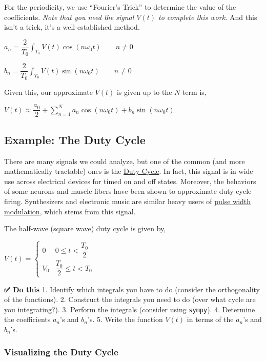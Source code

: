 For the periodicity, we use ``Fourier's Trick'' to determine the value
of the coefficients. \emph{Note that you need the signal \(V(t)\) to
complete this work.} And this isn't a trick, it's a well-established
method.

\(a_n = \dfrac{2}{T_0}\int_{T_0}V(t)\cos(n\omega_0t)\qquad n\neq0\)

\(b_n = \dfrac{2}{T_0}\int_{T_0}V(t)\sin(n\omega_0t)\qquad n\neq0\)

Given this, our approximate \(V(t)\) is given up to the \(N\) term is,

\(V(t) \approx \dfrac{a_0}{2} + \sum_{n=1}^{N} a_n \cos(n\omega_0t) + b_n \sin(n\omega_0t)\)

\subsection{Example: The Duty Cycle}\label{example-the-duty-cycle}

There are many signals we could analyze, but one of the common (and more
mathematically tractable) ones is the
\href{https://en.wikipedia.org/wiki/Duty_cycle}{Duty Cycle}. In fact,
this signal is in wide use across electrical devices for timed on and
off states. Moreover, the behaviors of some neurons and muscle fibers
have been shown to approximate duty cycle firing. Synthesizers and
electronic music are similar heavy users of
\href{https://en.wikipedia.org/wiki/Pulse-width_modulation}{pulse width
modulation}, which stems from this signal.

The half-wave (square wave) duty cycle is given by,

\(V(t) = \begin{cases} 0 & 0 \leq t < \dfrac{T_0}{2} \\ V_0 & \dfrac{T_0}{2} \leq t < T_0 \end{cases}\)

\textbf{✅ Do this} 1. Identify which integrals you have to do (consider
the orthogonality of the functions). 2. Construct the integrals you need
to do (over what cycle are you integrating?). 3. Perform the integrals
(consider using \texttt{sympy}). 4. Determine the coefficients \(a_n\)'s
and \(b_n\)'s. 5. Write the function \(V(t)\) in terms of the \(a_n\)'s
and \(b_n\)'s.

\subsubsection{Visualizing the Duty
Cycle}\label{visualizing-the-duty-cycle}

